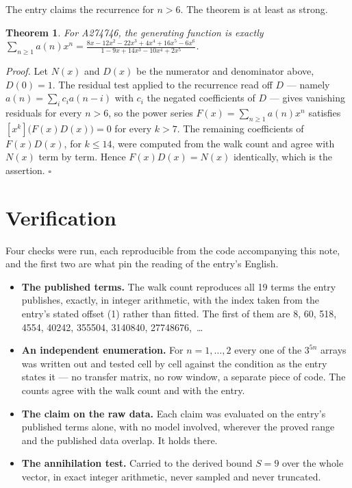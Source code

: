 \documentclass[11pt]{article}
\newtheorem{theorem}{Theorem}
\theoremstyle{definition}
\begin{document}
The entry claims the recurrence for $n > 6$. The theorem is at least as strong.

\begin{theorem} For A274746, the generating function is exactly $\sum_{n\ge 1} a(n)x^n = \frac{8x - 12x^{2} - 22x^{3} + 4x^{4} + 16x^{5} - 6x^{6}}{1 - 9x + 14x^{3} - 10x^{4} + 2x^{5}}$.\end{theorem}

{\itshape Proof.} Let $N(x)$ and $D(x)$ be the numerator and denominator above, $D(0)=1$. The residual test applied to the recurrence read off $D$ --- namely $a(n) = \sum_i c_i a(n-i)$ with $c_i$ the negated coefficients of $D$ --- gives vanishing residuals for every $n > 6$, so the power series $F(x)=\sum_{n\ge 1}a(n)x^n$ satisfies $[x^k]\bigl(F(x)D(x)\bigr) = 0$ for every $k > 7$. The remaining coefficients of $F(x)D(x)$, for $k \le 14$, were computed from the walk count and agree with $N(x)$ term by term. Hence $F(x)D(x) = N(x)$ identically, which is the assertion. $\square$

\section{Verification}

Four checks were run, each reproducible from the code accompanying this note, and the first two are what pin the reading of the entry's English.

\begin{itemize}

\item {\bfseries The published terms.} The walk count reproduces all 19 terms the entry publishes, exactly, in integer arithmetic, with the index taken from the entry's stated offset (1) rather than fitted. The first of them are 8, 60, 518, 4554, 40242, 355504, 3140840, 27748676,~\dots

\item {\bfseries An independent enumeration.} For $n = 1,\dots,2$ every one of the $3^{5n}$ arrays was written out and tested cell by cell against the condition as the entry states it --- no transfer matrix, no row window, a separate piece of code. The counts agree with the walk count and with the entry.

\item {\bfseries The claim on the raw data.} Each claim was evaluated on the entry's published terms alone, with no model involved, wherever the proved range and the published data overlap. It holds there.

\item {\bfseries The annihilation test.} Carried to the derived bound $S = 9$ over the whole vector, in exact integer arithmetic, never sampled and never truncated.

\end{itemize}
\end{document}
